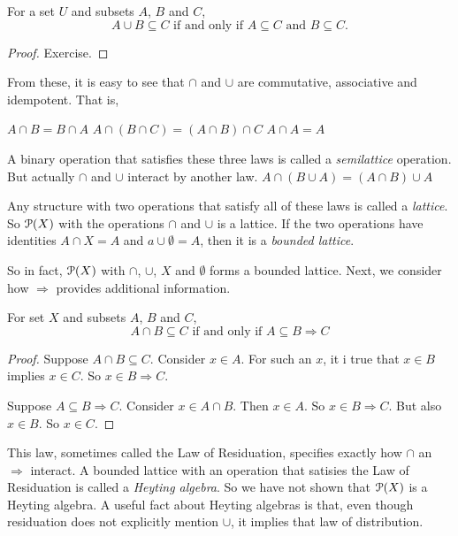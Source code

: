 \begin{lemma}
	For a set $U$ and subsets $A$, $B$ and $C$,
	\[\text{$A\cup B\subseteq C$ if and only if $A\subseteq C$ and $B\subseteq C$.}\]
	
	\begin{proof}
		Exercise.
	\end{proof}
\end{lemma}

From these, it is easy to see that $\cap$ and $\cup$ are commutative, associative
and idempotent. That is,

$A\cap B = B\cap A$
$A\cap (B\cap C) = (A\cap B)\cap C$
$A\cap A = A$

A binary operation that satisfies these three laws is called a \emph{semilattice} operation. But actually $\cap$ and $\cup$ interact by another law.
$A\cap (B\cup A) = (A\cap B)\cup A$

Any structure with two operations that satisfy all of these laws is called a \emph{lattice}. So ${\mathcal{P}}(X)$ with the operations $\cap$ and $\cup$ is a lattice. If the two operations have identities $A\cap X = A$ and $a\cup \emptyset = A$, then it is a \emph{bounded lattice}. 

So in fact, ${\mathcal{P}}(X)$ with $\cap$, $\cup$, $X$ and $\emptyset$ forms a bounded lattice. Next, we consider how $\Rightarrow$ provides additional information.

\begin{lemma}
	For set $X$ and subsets $A$, $B$ and $C$,
	\[\text{$A\cap B\subseteq C$ if and only if $A\subseteq B\Rightarrow C$}\]
	
	\begin{proof}
		Suppose $A\cap B\subseteq C$. Consider $x\in A$. 
		For such an $x$, it i true that $x\in B$ implies $x\in C$.
		So $x\in B\Rightarrow C$.
		
		Suppose $A\subseteq B\Rightarrow C$.
		Consider $x\in A\cap B$. 
		Then $x\in A$. So $x\in B\Rightarrow C$.
		But also $x\in B$. So $x\in C$. 		
	\end{proof}
\end{lemma}

This law, sometimes called the Law of Residuation, specifies exactly how $\cap$ an $\Rightarrow$ interact. A bounded lattice with an operation that satisies the Law of Residuation is called a \emph{Heyting algebra}. So we have not shown that ${\mathcal{P}}(X)$ is a Heyting algebra. A useful fact about Heyting algebras is that, even though residuation does not explicitly mention $\cup$, it implies that law of distribution.

